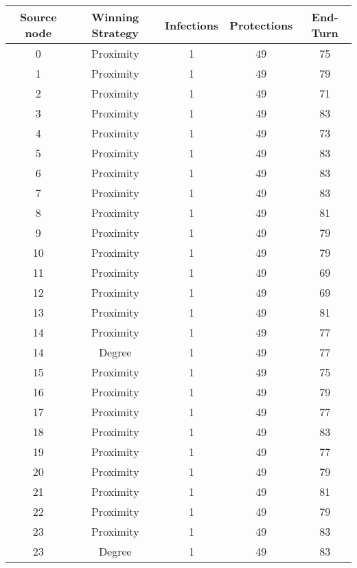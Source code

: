 \documentclass[results.tex]{subfiles}
\begin{document}
\begin{center}
  \begin{tabular}{| c || c | c | c | c |}
    \hline
    {\bfseries Source node} & {\bfseries Winning Strategy} & {\bfseries Infections} & {\bfseries Protections} & {\bfseries End-Turn} \\  %
    \hline\hline
    0 & Proximity & 1 & 49 & 75 \\ 
    \hline
    1 & Proximity & 1 & 49 & 79 \\ 
    \hline
    2 & Proximity & 1 & 49 & 71 \\ 
    \hline
    3 & Proximity & 1 & 49 & 83 \\ 
    \hline
    4 & Proximity & 1 & 49 & 73 \\ 
    \hline
    5 & Proximity & 1 & 49 & 83 \\ 
    \hline
    6 & Proximity & 1 & 49 & 83 \\ 
    \hline
    7 & Proximity & 1 & 49 & 83 \\ 
    \hline
    8 & Proximity & 1 & 49 & 81 \\ 
    \hline
    9 & Proximity & 1 & 49 & 79 \\ 
    \hline
    10 & Proximity & 1 & 49 & 79 \\ 
    \hline
    11 & Proximity & 1 & 49 & 69 \\ 
    \hline
    12 & Proximity & 1 & 49 & 69 \\ 
    \hline
    13 & Proximity & 1 & 49 & 81 \\ 
    \hline
    14 & Proximity & 1 & 49 & 77 \\ 
    \hline
    14 & Degree & 1 & 49 & 77 \\ 
    \hline
    15 & Proximity & 1 & 49 & 75 \\ 
    \hline
    16 & Proximity & 1 & 49 & 79 \\ 
    \hline
    17 & Proximity & 1 & 49 & 77 \\ 
    \hline
    18 & Proximity & 1 & 49 & 83 \\ 
    \hline
    19 & Proximity & 1 & 49 & 77 \\ 
    \hline
    20 & Proximity & 1 & 49 & 79 \\ 
    \hline
    21 & Proximity & 1 & 49 & 81 \\ 
    \hline
    22 & Proximity & 1 & 49 & 79 \\ 
    \hline
    23 & Proximity & 1 & 49 & 83 \\ 
    \hline
    23 & Degree & 1 & 49 & 83 \\ 

\end{tabular}
\end{center}
\end{document}
